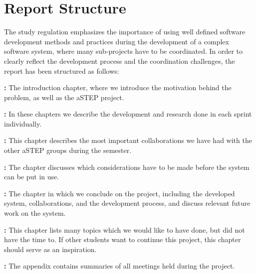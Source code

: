 \section{Report Structure} \label{sec:report_structure}
The study regulation emphasizes the importance of using well defined software development methods and practices during the development of a complex software system, where many sub-projects have to be coordinated. In order to clearly reflect the development process and the coordination challenges, the report has been structured as follows:

\textbf{:} The introduction chapter, where we introduce the motivation behind the problem, as well as the aSTEP project.

\textbf{:} In these chapters we describe the development and research done in each sprint individually.

\textbf{:} This chapter describes the most important collaborations we have had with the other aSTEP groups during the semester.

\textbf{:} The chapter discusses which considerations have to be made before the system can be put in use.

\textbf{:} The chapter in which we conclude on the project, including the developed system, collaborations, and the development process, and discuss relevant future work on the system.

\textbf{:} This chapter lists many topics which we would like to have done, but did not have the time to. If other students want to continue this project, this chapter should serve as an inspiration.

\textbf{:} The appendix contains summaries of all meetings held during the project.